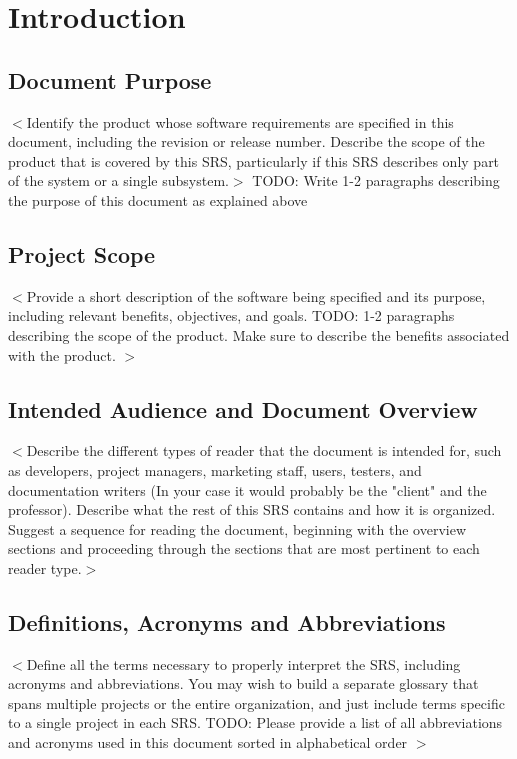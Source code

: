 \documentclass[a4paper, 11pt]{scrreprt}
\begin{document}
\clearpage
{}  %

\chapter{Introduction}

\section{Document Purpose}
$<$Identify the product whose software requirements are specified in this document, 
including the revision or release number. Describe the scope of the product that is 
covered by this SRS, particularly if this SRS describes only part of the system or a 
single subsystem.$>$
TODO: Write 1-2 paragraphs describing the purpose of this document as explained above

\section{Project Scope}
$<$Provide a short description of the software being specified and its purpose, including relevant benefits, objectives, and goals. 
TODO: 1-2 paragraphs describing the scope of the product. Make sure to describe the benefits associated with the product.
$>$

\section{Intended Audience and Document Overview}
$<$Describe the different types of reader that the document is intended for, such as developers, project managers, marketing staff, users, testers, and documentation writers (In your case it would probably be the "client" and the professor). Describe what the rest of this SRS contains and how it is organized. Suggest a sequence for reading the document, beginning with the overview sections and proceeding through the sections that are most pertinent to each reader type.$>$

\section{Definitions, Acronyms and Abbreviations}
$<$Define all the terms necessary to properly interpret the SRS, including acronyms and abbreviations. You may wish to build a separate glossary that spans multiple projects or the entire organization, and just include terms specific to a single project in each SRS.
TODO: Please provide a list of all abbreviations and acronyms used in this document sorted in alphabetical order
$>$
\end{document}
